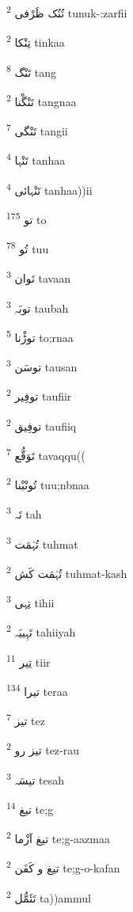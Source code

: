 \documentclass[12pt]{article}
\begin{document}
\begin{RTL}
\begin{multicols}{5}
{\ur تُنُک ظَرْفی}   \textsuperscript{2} tunuk-:zarfii

{\ur تِنْکا}   \textsuperscript{2} tinkaa

{\ur تَنْگ}   \textsuperscript{8} tang

{\ur تَنْگْنا}   \textsuperscript{2} tangnaa

{\ur تَنْگی}   \textsuperscript{7} tangii

{\ur تَنْہا}   \textsuperscript{4} tanhaa

{\ur تَنْہائی}   \textsuperscript{4} tanhaa))ii

{\ur تو}   \textsuperscript{175} to

{\ur تُو}   \textsuperscript{78} tuu

{\ur تَوان}   \textsuperscript{3} tavaan

{\ur توبَہ}   \textsuperscript{3} taubah

{\ur توڑْنا}   \textsuperscript{5} to;rnaa

{\ur توسَن}   \textsuperscript{3} tausan

{\ur توفِیر}   \textsuperscript{2} taufiir

{\ur توفِیق}   \textsuperscript{2} taufiiq

{\ur تَوَقُّع}   \textsuperscript{7} tavaqqu((

{\ur تُونْبْنا}   \textsuperscript{2} tuu;nbnaa

{\ur تَہ}   \textsuperscript{3} tah

{\ur تُہْمَت}   \textsuperscript{3} tuhmat

{\ur تُہْمَت کَش}   \textsuperscript{2} tuhmat-kash

{\ur تِہی}   \textsuperscript{3} tihii

{\ur تَہِییَہ}   \textsuperscript{2} tahiiyah

{\ur تِیر}   \textsuperscript{11} tiir

{\ur تیرا}   \textsuperscript{134} teraa

{\ur تیز}   \textsuperscript{7} tez

{\ur تیز رو}   \textsuperscript{2} tez-rau

{\ur تیسَہ}   \textsuperscript{3} tesah

{\ur تیغ}   \textsuperscript{14} te;g

{\ur تیغ آزْما}   \textsuperscript{2} te;g-aazmaa

{\ur تیغ و کَفَن}   \textsuperscript{2} te;g-o-kafan

{\ur تَئَمُّل}   \textsuperscript{2} ta))ammul


\end{multicols}
\end{RTL}
\end{document}

